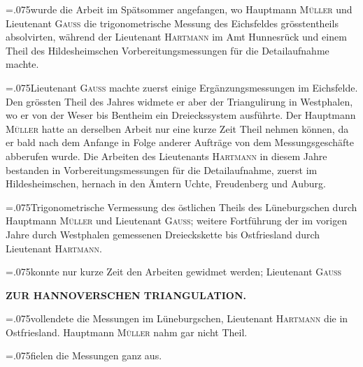 {\hangindent=.075\linewidth{}\noindent{}wurde die Arbeit im Spätsommer angefangen, wo Hauptmann \textsc{Müller} und Lieutenant \textsc{Gauss} die trigonometrische Messung des Eichsfeldes grösstentheils absolvirten, während der Lieutenant \textsc{Hartmann} im Amt Hunnesrück und einem Theil des Hildesheimschen Vorbereitungsmessungen für die Detailaufnahme machte.\par}

{\hangindent=.075\linewidth{}\noindent{}\enspace Lieutenant \textsc{Gauss} machte zuerst einige Ergänzungsmessungen im Eichsfelde. Den grössten Theil des Jahres widmete er aber der Triangulirung in Westphalen, wo er von der Weser bis Bentheim ein Dreieckssystem ausführte. Der Hauptmann \textsc{Müller} hatte an derselben Arbeit nur eine kurze Zeit Theil nehmen können, da er bald nach dem Anfange in Folge anderer Aufträge von dem Messungsgeschäfte abberufen wurde. Die Arbeiten des Lieutenants \textsc{Hartmann} in diesem Jahre bestanden in Vorbereitungsmessungen für die Detailaufnahme, zuerst im Hildesheimschen, hernach in den Ämtern Uchte, Freudenberg und Auburg.\par}

{\hangindent=.075\linewidth{}\noindent{}\enspace Trigonometrische Vermessung des östlichen Theils des Lüneburgschen durch Hauptmann \textsc{Müller} und Lieutenant \textsc{Gauss}; weitere Fortführung der im vorigen Jahre durch Westphalen gemessenen Dreieckskette bis Ostfriesland durch Lieutenant \textsc{Hartmann}.\par}

{\hangindent=.075\linewidth{}\noindent{}konnte nur kurze Zeit den Arbeiten gewidmet werden; Lieutenant \textsc{Gauss}\par}

\par\clearpage
\noindent\null\hfill{\small\textbf{ZUR HANNOVERSCHEN TRIANGULATION.}}\hfill{}\par\medskip

{\leftskip=.075\linewidth\noindent vollendete die Messungen im Lüneburgschen, Lieutenant \textsc{Hartmann} die in Ostfriesland. Hauptmann \textsc{Müller} nahm gar nicht Theil.\par}

{\hangindent=.075\linewidth{}\noindent{}fielen die Messungen ganz aus.\par}

